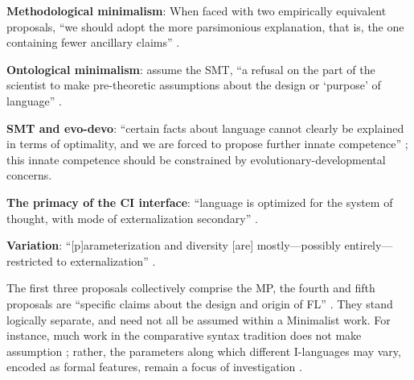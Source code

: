\begin{subexamples}[preamble={\textbf{The Minimalist Proposals} \parencite{MobbsI_2015}}]\label{ex:minprops}
    \item\label{ex:minprops:1} \textbf{Methodological minimalism}: When faced with two empirically equivalent proposals, ``we should adopt the more parsimonious explanation, that is, the one containing fewer ancillary claims'' \parencite[38]{MobbsI_2015}.
    \item\label{ex:minprops:2} \textbf{Ontological minimalism}: assume the SMT, ``a refusal on the part of the scientist to make pre-theoretic assumptions about the design or `purpose' of language'' \parencite[41]{MobbsI_2015}.
    \item\label{ex:minprops:3} \textbf{SMT and evo-devo}: ``certain facts about language cannot clearly be explained in terms of optimality, and we are forced to propose further innate competence'' \parencite[46]{MobbsI_2015}; this innate competence should be constrained by evolutionary-developmental concerns.
    \item\label{ex:minprops:4} \textbf{The primacy of the CI interface}: ``language is optimized for the system of thought, with mode of externalization secondary'' \parencite[32]{BerwickRC.ChomskyN_2011}.
    \item\label{ex:minprops:5} \textbf{Variation}: ``[p]arameterization and diversity [are] mostly---possibly entirely---restricted to externalization'' \parencite[37]{BerwickRC.ChomskyN_2011}.
\end{subexamples}

The first three proposals collectively comprise the MP, the fourth and fifth proposals are ``specific claims about the design and origin of FL'' \parencite[2]{MobbsI_2015}. They stand logically separate, and need not all be assumed within a Minimalist work. For instance, much work in the comparative syntax tradition does not make assumption ; rather, the parameters along which different I-languages may vary, encoded as formal features, remain a focus of investigation \parencite[see]{RobertsI_2019,SheehanM.etal_2017,BiberauerT.etal_2010}.

